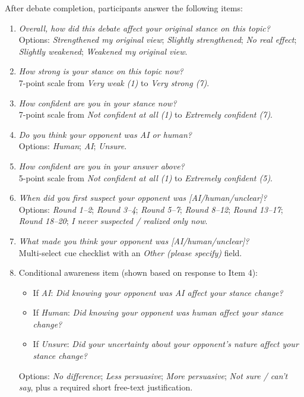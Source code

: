 After debate completion, participants answer the following items:
\begin{enumerate}
      \item \textit{Overall, how did this debate affect your original stance on this topic?}
      \\
      Options: \textit{Strengthened my original view}; \textit{Slightly strengthened};
      \textit{No real effect}; \textit{Slightly weakened}; \textit{Weakened my original view}.

      \item \textit{How strong is your stance on this topic now?}
      \\
      7-point scale from \textit{Very weak (1)} to \textit{Very strong (7)}.

      \item \textit{How confident are you in your stance now?}
      \\
      7-point scale from \textit{Not confident at all (1)} to
      \textit{Extremely confident (7)}.

      \item \textit{Do you think your opponent was AI or human?}
      \\
      Options: \textit{Human}; \textit{AI}; \textit{Unsure}.

      \item \textit{How confident are you in your answer above?}
      \\
      5-point scale from \textit{Not confident at all (1)} to
      \textit{Extremely confident (5)}.

      \item \textit{When did you first suspect your opponent was [AI/human/unclear]?}
      \\
      Options: \textit{Round 1--2}; \textit{Round 3--4}; \textit{Round 5--7};
      \textit{Round 8--12}; \textit{Round 13--17}; \textit{Round 18--20};
      \textit{I never suspected / realized only now}.

      \item \textit{What made you think your opponent was [AI/human/unclear]?}
      \\
      Multi-select cue checklist with an \textit{Other (please specify)} field.

      \item Conditional awareness item (shown based on response to Item 4):
      \begin{itemize}
            \item If \textit{AI}: \textit{Did knowing your opponent was AI affect your stance change?}
            \item If \textit{Human}: \textit{Did knowing your opponent was human affect your stance change?}
            \item If \textit{Unsure}: \textit{Did your uncertainty about your opponent's nature affect your stance change?}
      \end{itemize}
      Options: \textit{No difference}; \textit{Less persuasive};
      \textit{More persuasive}; \textit{Not sure / can't say}, plus a required
      short free-text justification.
\end{enumerate}


